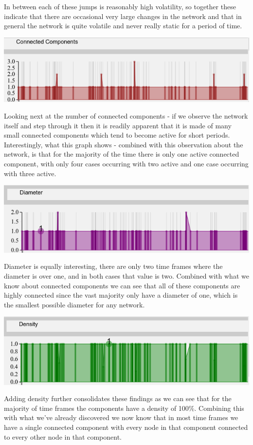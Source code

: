In between each of these jumps is reasonably high volatility, so together these indicate that there are occasional very large changes in the network and that in general the network is quite volatile and never really static for a period of time.
    
\begin{center}
\includegraphics[trim={0 0 0 0}, width=140mm]{./Figures/TurinConnectedComponents.png}
\end{center}  
Looking next at the number of connected components - if we observe the network itself and step through it then it is readily apparent that it is made of many small connected components which tend to become active for short periods. Interestingly, what this graph shows - combined with this observation about the network, is that for the majority of the time there is only one active connected component, with only four cases occurring with two active and one case occurring with three active.
    

\begin{center}
\includegraphics[trim={0 0 0 0}, width=140mm]{./Figures/TurinDiameter.png}
\end{center}
Diameter is equally interesting, there are only two time frames where the diameter is over one, and in both cases that value is two. Combined with what we know about connected components we can see that all of these components are highly connected since the vast majority only have a diameter of one, which is the smallest possible diameter for any network.
    
\begin{center}
\includegraphics[trim={0 0 0 0}, width=140mm]{./Figures/TurinDensity.png}
\end{center}    
Adding density further consolidates these findings as we can see that for the majority of time frames the components have a density of 100\%. Combining this with what we've already discovered we now know that in most time frames we have a single connected component with every node in that component connected to every other node in that component.

